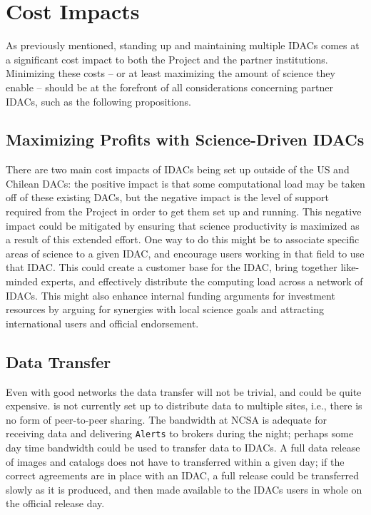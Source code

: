 \section{Cost Impacts}\label{sec:costs}

As previously mentioned, standing up and maintaining multiple IDACs comes at a significant cost impact to both the \RO Project and the partner institutions. Minimizing these costs -- or at least maximizing the amount of science they enable -- should be at the forefront of all considerations concerning partner IDACs, such as the following propositions.

\subsection{Maximizing Profits with Science-Driven IDACs}
There are two main cost impacts of IDACs being set up outside of the \gls{US} and Chilean DACs: the positive impact is that some computational load may be taken off of these existing DACs, but the negative impact is the level of support required from the \RO Project in order to get them set up and running. This negative impact could be mitigated by ensuring that science productivity is maximized as a result of this extended effort. One way to do this might be to associate specific areas of science to a given \gls{IDAC}, and encourage users working in that field to use that \gls{IDAC}. This could create a customer base for the \gls{IDAC}, bring together like-minded experts, and effectively distribute the computing load across a network of IDACs. This might also enhance internal funding arguments for investment resources by arguing for synergies with local science goals and attracting international users and official endorsement.

\subsection{Data Transfer}\label{sec:xfer}
Even with good networks the data transfer will not be trivial, and could be quite expensive. \RO is not currently set up to distribute data to multiple sites, i.e., there is no form of peer-to-peer sharing. The bandwidth at \gls{NCSA} is adequate for receiving data and delivering {\tt Alerts} to brokers during the night; perhaps some day time bandwidth could be used to transfer data to IDACs. A full data release of images and catalogs does not have to transferred within a given day; if the correct agreements are in place with an \gls{IDAC}, a full release could be transferred slowly as it is produced, and then made available to the IDACs users in whole on the official release day.


